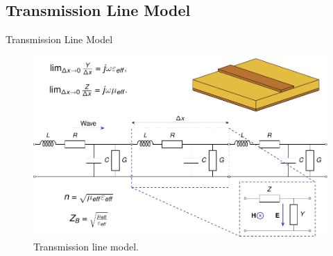 \subsection{Transmission Line Model}

\begin{frame}{Transmission Line Model}
    \begin{figure}
        \centering
        \includegraphics[width=\textwidth]{Figures/TL_equivalent_circuit.pdf}
        \caption{Transmission line model. \cite{maasch2016tunable}}
        \label{fig:TL_equivalent_circuit}
    \end{figure}
\end{frame}